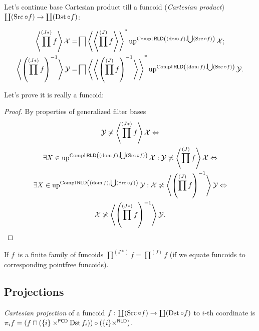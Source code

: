 \begin{defn}
Let's continue base Cartesian product till
a funcoid (\emph{Cartesian product}) $\coprod(\operatorname{Src}\circ f)\to\coprod(\operatorname{Dst}\circ f)$:
\end{defn}

\begin{align*}
\left\langle \prod^{(J\ast)} f\right\rangle\mathcal{X} =&
\bigsqcap\left\langle \left\langle \prod^{(J)}f\right\rangle\right\rangle ^{\ast}\operatorname{up}^{\operatorname{Compl}\mathsf{RLD}\left((\operatorname{dom} f),\bigcup(\operatorname{Src}\circ f)\right)}\mathcal{X};\\
\left\langle \left(\prod^{(J\ast)} f\right)^{-1}\right\rangle\mathcal{Y} =&
\bigsqcap\left\langle \left\langle \left(\prod^{(J)}f\right)^{-1}\right\rangle\right\rangle ^{\ast}\operatorname{up}^{\operatorname{Compl}\mathsf{RLD}\left((\operatorname{dom} f),\bigcup(\operatorname{Src}\circ f)\right)}\mathcal{Y}.
\end{align*}

Let's prove it is really a funcoid:

\begin{proof}
By properties of generalized filter bases
\begin{multline*}
\mathcal{Y}\not\asymp\left\langle \prod^{(J\ast)} f\right\rangle\mathcal{X}
\Leftrightarrow\\
\exists X\in\operatorname{up}^{\operatorname{Compl}\mathsf{RLD}\left((\operatorname{dom} f),\bigcup(\operatorname{Src}\circ f)\right)}\mathcal{X}:
\mathcal{Y}\not\asymp\left\langle \prod^{(J)}f\right\rangle\mathcal{X}
\Leftrightarrow\\
\exists X\in\operatorname{up}^{\operatorname{Compl}\mathsf{RLD}\left((\operatorname{dom} f),\bigcup(\operatorname{Src}\circ f)\right)}\mathcal{Y}:
\mathcal{X}\not\asymp\left\langle \left(\prod^{(J)}f\right)^{-1}\right\rangle\mathcal{Y}
\Leftrightarrow\\
\mathcal{X}\not\asymp
\left\langle \left(\prod^{(J\ast)} f\right)^{-1}\right\rangle\mathcal{Y}.
\end{multline*}
\end{proof}

\begin{obvious}
If $f$~is a finite family of funcoids $\prod^{(J\ast)}f=\prod^{(J)}f$ (if we equate funcoids to corresponding pointfree funcoids).
\end{obvious}

\subsection{Projections}

\begin{defn}
\emph{Cartesian projection} of a funcoid $f: \coprod(\operatorname{Src}\circ f)\to\coprod(\operatorname{Dst}\circ f)$ to $i$-th coordinate is
$\pi_i f=
(f\sqcap(\{i\}\times^{\mathsf{FCD}}\operatorname{Dst} f_i))\circ
(\{i\}\times^{\mathsf{RLD}})$.
\end{defn}

